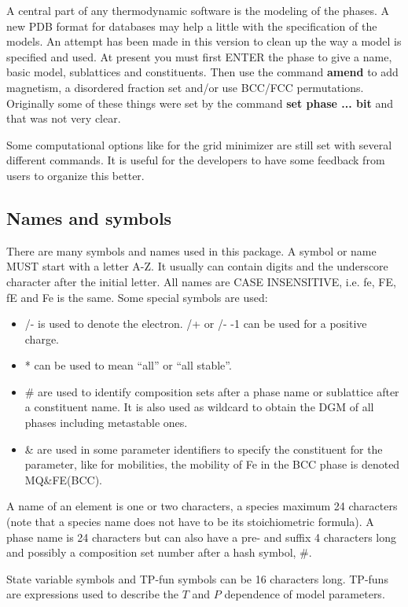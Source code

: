 \documentclass[11pt]{article}
\begin{document}
A central part of any thermodynamic software is the modeling of the
phases.  A new PDB format for databases may help a little with the
specification of the models.  An attempt has been made in this version
to clean up the way a model is specified and used.  At present you
must first ENTER the phase to give a name, basic model, sublattices
and constituents.  Then use the command {\bf amend} to add magnetism,
a disordered fraction set and/or use BCC/FCC permutations.  Originally
some of these things were set by the command {\bf set phase ... bit}
and that was not very clear.

Some computational options like for the grid minimizer are still set
with several different commands.  It is useful for the developers to
have some feedback from users to organize this better.

\subsection{Names and symbols}

There are many symbols and names used in this package.  A symbol or
name MUST start with a letter A-Z.  It usually can contain digits and
the underscore character after the initial letter.  All names are CASE
INSENSITIVE, i.e. fe, FE, fE and Fe is the same.  Some special symbols
are used:

\begin{itemize}
\item /- is used to denote the electron. /+ or /- -1 can be used for a
  positive charge.
\item * can be used to mean ``all'' or ``all stable''.
\item \# are used to identify composition sets after a phase name or
  sublattice after a constituent name.  It is also used as wildcard
  to obtain the DGM of all phases including metastable ones.
\item \& are used in some parameter identifiers to specify the
  constituent for the parameter, like for mobilities, the mobility of
  Fe in the BCC phase is denoted MQ\&FE(BCC).
\end{itemize}

A name of an element is one or two characters, a species maximum 24
characters (note that a species name does not have to be its
stoichiometric formula).  A phase name is 24 characters but can also
have a pre- and suffix 4 characters long and possibly a composition
set number after a hash symbol, \#.

State variable symbols and TP-fun symbols can be 16 characters long.
TP-funs are expressions used to describe the $T$ and $P$ dependence of
model parameters.
\end{document}
